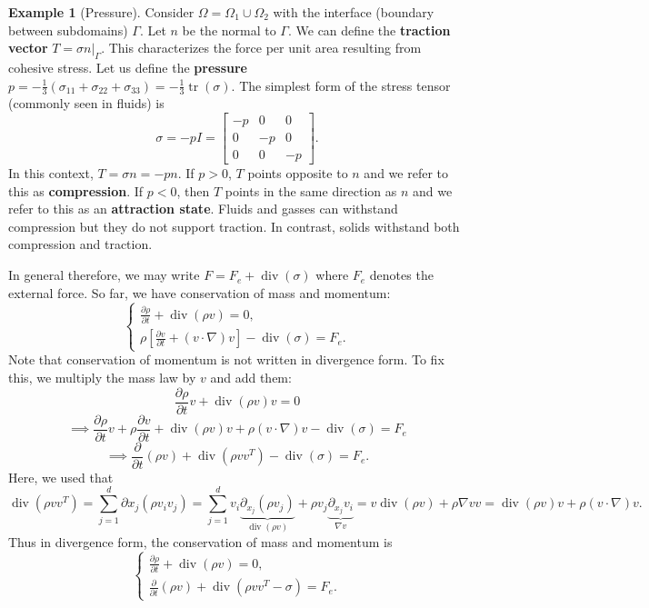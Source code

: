 \documentclass{article}
\theoremstyle{definition}
\newtheorem{example}[theorem]{Example}
\theoremstyle{definition}
\begin{document}
\begin{example}[Pressure]
    Consider $\Omega=\Omega_1\cup \Omega_2$ with the interface (boundary between subdomains) $\Gamma$. Let $n$ be the normal to $\Gamma$. We can define the \textbf{traction vector} $T=\sigma n\big|_{\Gamma}$. This characterizes the force per unit area resulting from cohesive stress. Let us define the \textbf{pressure} $p=-\frac{1}{3}(\sigma_{11}+\sigma_{22}+\sigma_{33})=-\frac{1}{3}\operatorname{tr}(\sigma)$. The simplest form of the stress tensor (commonly seen in fluids) is
    $$\sigma=-pI=\begin{bmatrix}
        -p & 0 & 0 \\
        0 & -p & 0 \\
        0 & 0 & -p
    \end{bmatrix}.$$
    In this context, $T=\sigma n=-pn$. If $p>0$, $T$ points opposite to $n$ and we refer to this as \textbf{compression}. If $p<0$, then $T$ points in the same direction as $n$ and we refer to this as an \textbf{attraction state}. Fluids and gasses can withstand compression but they do not support traction. In contrast, solids withstand both compression and traction.
\end{example}
In general therefore, we may write $F=F_{e}+\operatorname{div}(\sigma)$ where $F_e$ denotes the external force. So far, we have conservation of mass and momentum:
$$\begin{cases}
    \frac{\partial \rho}{\partial t}+\operatorname{div}(\rho v)=0, \\
    \rho\left[\frac{\partial v}{\partial t}+(v\cdot \nabla)v\right]-\operatorname{div}(\sigma)=F_e.
\end{cases}$$
Note that conservation of momentum is not written in divergence form. To fix this, we multiply the mass law by $v$ and add them:
$$\frac{\partial \rho}{\partial t}v+\operatorname{div}(\rho v)v=0$$
$$\implies \frac{\partial \rho}{\partial t}v+\rho\frac{\partial v}{\partial t}+\operatorname{div}(\rho v)v+\rho (v\cdot \nabla)v-\operatorname{div}(\sigma)=F_e$$
$$\implies \frac{\partial}{\partial t}(\rho v)+\operatorname{div}(\rho vv^T)-\operatorname{div}(\sigma)=F_e.$$
Here, we used that
$$\operatorname{div}(\rho vv^T)=\sum_{j=1}^{d}\partial x_{j}(\rho v_iv_j)=\sum_{j=1}^{d}v_i\underbrace{\partial_{x_j}(\rho v_j)}_{\operatorname{div}(\rho v)}+\rho v_j \underbrace{\partial_{x_j}v_i}_{\nabla v}=v\operatorname{div}(\rho v)+\rho \nabla v v=\operatorname{div}(\rho v)v+\rho(v\cdot \nabla)v.$$
Thus in divergence form, the conservation of mass and momentum is
$$\begin{cases}
    \frac{\partial \rho}{\partial t}+\operatorname{div}(\rho v)=0, \\
    \frac{\partial}{\partial t}(\rho v)+\operatorname{div}(\rho vv^T-\sigma)=F_e.
\end{cases}$$
\end{document}
